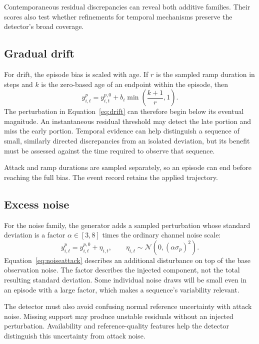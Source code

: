 Contemporaneous residual discrepancies can reveal both additive families. Their scores also test whether refinements for temporal mechanisms preserve the detector's broad coverage.

\subsection{Gradual drift}
For drift, the episode bias is scaled with age. If $r$ is the sampled ramp duration in steps and $k$ is the zero-based age of an endpoint within the episode, then
\begin{equation}
 y^p_{i,t}=y^{p,0}_{i,t}+b_i\min\left(\frac{k+1}{r},1\right).
 \label{eq:drift}
\end{equation}
The perturbation in Equation~\eqref{eq:drift} can therefore begin below its eventual magnitude. An instantaneous residual threshold may detect the late portion and miss the early portion. Temporal evidence can help distinguish a sequence of small, similarly directed discrepancies from an isolated deviation, but its benefit must be assessed against the time required to observe that sequence.

Attack and ramp durations are sampled separately, so an episode can end before reaching the full bias. The event record retains the applied trajectory.

\subsection{Excess noise}
For the noise family, the generator adds a sampled perturbation whose standard deviation is a factor $\alpha\in[3,8]$ times the ordinary channel noise scale:
\begin{equation}
 y^p_{i,t}=y^{p,0}_{i,t}+\eta_{i,t},\qquad
 \eta_{i,t}\sim\mathcal N(0,(\alpha\sigma_p)^2).\label{eq:noiseattack}
\end{equation}
Equation~\eqref{eq:noiseattack} describes an additional disturbance on top of the base observation noise. The factor describes the injected component, not the total resulting standard deviation. Some individual noise draws will be small even in an episode with a large factor, which makes a sequence's variability relevant.

The detector must also avoid confusing normal reference uncertainty with attack noise. Missing support may produce unstable residuals without an injected perturbation. Availability and reference-quality features help the detector distinguish this uncertainty from attack noise.

